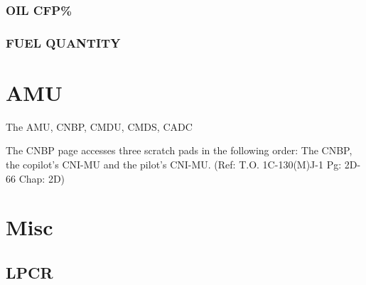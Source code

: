\subsection*{OIL CFP\%}

\subsection*{FUEL QUANTITY}

\chapter{AMU}
\label{chap:amu}

The \gls{AMU}, \gls{CNBP}, \gls{CMDU}, \gls{CMDS}, \gls{CADC}

The CNBP page accesses three scratch pads in the following order: The CNBP, the copilot's CNI-MU and the pilot's CNI-MU. (Ref: T.O. 1C-130(M)J-1 Pg: 2D-66 Chap: 2D)

\chapter{Misc}

\section{LPCR}

